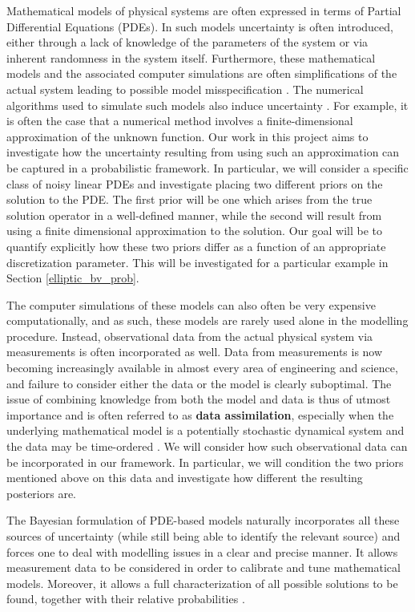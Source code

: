 
Mathematical models of physical systems are often expressed in terms of Partial Differential Equations (PDEs). In such models uncertainty is often introduced, either through a lack of knowledge of the parameters of the system or via inherent randomness in the system itself. Furthermore, these mathematical models and the associated computer simulations are often simplifications of the actual system leading to possible model misspecification \textcolor{blue}{\citep{girolami2019statistical}}. The numerical algorithms used to simulate such models also induce uncertainty \textcolor{blue}{\citep{conrad2017statistical}}. For example, it is often the case that a numerical method involves a finite-dimensional approximation of the unknown function. Our work in this project aims to investigate how the uncertainty resulting from using such an approximation can be captured in a probabilistic framework. In particular, we will consider a specific class of noisy linear PDEs and investigate placing two different priors on the solution to the PDE. The first prior will be one which arises from the true solution operator in a well-defined manner, while the second will result from using a finite dimensional approximation to the solution. Our goal will be to quantify explicitly how these two priors differ as a function of an appropriate discretization parameter. This will be investigated for a particular example in Section \textcolor{blue}{\ref{elliptic_bv_prob}}.

The computer simulations of these models can also often be very expensive computationally, and as such, these models are rarely used alone in the modelling procedure. Instead, observational data from the actual physical system via measurements is often incorporated as well. Data from measurements is now becoming increasingly available in almost every area of engineering and science, and failure to consider either the data or the model is clearly suboptimal. The issue of combining knowledge from both the model and data is thus of utmost importance and is often referred to as \textbf{data assimilation}, especially when the underlying mathematical model is a potentially stochastic dynamical system and the data may be time-ordered \textcolor{blue}{\citep{law2015data}}. We will consider how such observational data can be incorporated in our framework. In particular, we will condition the two priors mentioned above on this data and investigate how different the resulting posteriors are.

The Bayesian formulation of PDE-based models naturally incorporates all these sources of uncertainty (while still being able to identify the relevant source) and forces one to deal with modelling issues in a clear and precise manner. It allows measurement data to be considered in order to calibrate and tune mathematical models. Moreover, it allows a full characterization of all possible solutions to be found, together with their relative probabilities \textcolor{blue}{\citep{stuart2010inverse}}.

